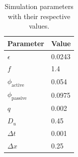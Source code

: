 \begin{table}[H]
    \centering
    \begin{tabularx}{\textwidth}{|X|X|} 
        \hline
    \textbf{Parameter} & \textbf{Value} \\ \hline
    $\epsilon$         & 0.0243         \\
    $f$                & 1.4            \\ 
    $\phi_{\text{active}}$ & 0.054          \\ 
    $\phi_{\text{passive}}$ & 0.0975          \\
    $q$                & 0.002          \\ 
    $D_u$              & 0.45           \\ 
    $\Delta t$         & 0.001          \\
    $\Delta x$              & 0.25           \\
    \hline
    \end{tabularx}
    \caption{Simulation parameters with their respective values.}
    \label{tab:simulation-parameters}
\end{table}
